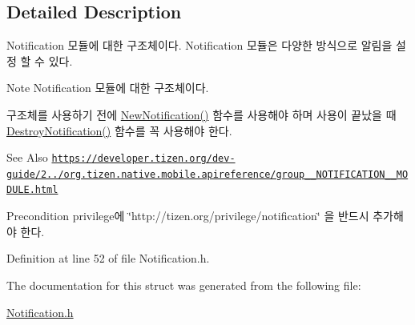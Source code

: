 \subsection{Detailed Description}
Notification 모듈에 대한 구조체이다. Notification 모듈은 다양한 방식으로 알림을 설정 할 수 있다. 

\begin{DoxyNote}{Note}
Notification 모듈에 대한 구조체이다. \par
 구조체를 사용하기 전에 \hyperlink{Notification_8h_a404347c07b739823c244d09934047898}{New\-Notification()} 함수를 사용해야 하며 사용이 끝났을 때 \hyperlink{Notification_8h_a940d91a8e15dc9c5fd098c134842a326}{Destroy\-Notification()} 함수를 꼭 사용해야 한다. 
\end{DoxyNote}
\begin{DoxySeeAlso}{See Also}
\href{https://developer.tizen.org/dev-guide/2.3.0/org.tizen.native.mobile.apireference/group__NOTIFICATION__MODULE.html}{\tt https\-://developer.\-tizen.\-org/dev-\/guide/2../org.\-tizen.\-native.\-mobile.\-apireference/group\-\_\-\-\_\-\-N\-O\-T\-I\-F\-I\-C\-A\-T\-I\-O\-N\-\_\-\-\_\-\-M\-O\-D\-U\-L\-E.\-html} 
\end{DoxySeeAlso}
\begin{DoxyPrecond}{Precondition}
privilege에 \char`\"{}http\-://tizen.\-org/privilege/notification\char`\"{} 을 반드시 추가해야 한다. 
\end{DoxyPrecond}


Definition at line 52 of file Notification.\-h.



The documentation for this struct was generated from the following file\-:\begin{DoxyCompactItemize}
\item 
\hyperlink{Notification_8h}{Notification.\-h}\end{DoxyCompactItemize}
